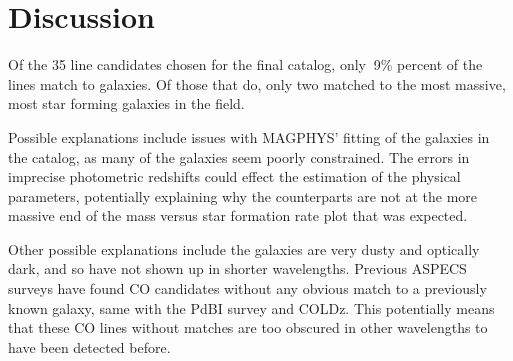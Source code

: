 
\section{Discussion}

Of the 35 line candidates chosen for the final catalog, only $~$9\% percent of the lines match to galaxies. Of those that do, only two matched to the most massive, most star forming galaxies in the field.


Possible explanations include issues with MAGPHYS' fitting of the galaxies in the catalog, as many of the galaxies seem poorly constrained. The errors in imprecise photometric redshifts could effect the estimation of the physical parameters, potentially explaining why the counterparts are not at the more massive end of the mass versus star formation rate plot that was expected.


Other possible explanations include the galaxies are very dusty and optically dark, and so have not shown up in shorter wavelengths. Previous ASPECS surveys have found CO candidates without any obvious match to a previously known galaxy, same with the PdBI survey and COLDz. This potentially means that these CO lines without matches are too obscured in other wavelengths to have been detected before. 


